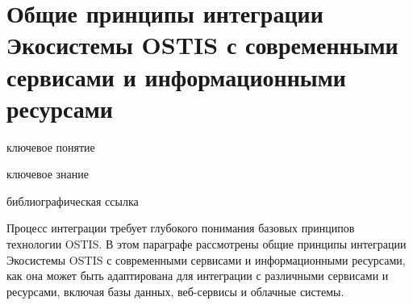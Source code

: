 \section{Общие принципы интеграции Экосистемы OSTIS с современными сервисами и информационными ресурсами}
{\label{sec_integration_common_principles}}

\begin{SCn}

    \bigskip
    
    \begin{scnrelfromlist}{ключевое понятие}
    \end{scnrelfromlist}
    
    \bigskip
    
    \begin{scnrelfromlist}{ключевое знание}
    \end{scnrelfromlist}
    
    \bigskip
    
    \begin{scnrelfromlist}{библиографическая ссылка}
    \end{scnrelfromlist}
    
\end{SCn}

Процесс интеграции требует глубокого понимания базовых принципов технологии OSTIS. 
В этом параграфе рассмотрены общие принципы интеграции Экосистемы OSTIS с современными сервисами и информационными ресурсами, как она может быть адаптирована для интеграции с различными сервисами и ресурсами, включая базы данных, веб-сервисы и облачные системы.

